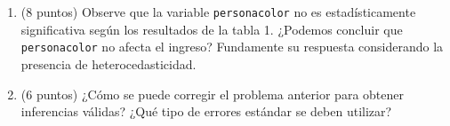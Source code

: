 \documentclass[10pt,a4paper]{article}
\begin{document}
\begin{enumerate}
\begin{enumerate}
    \[
    \hat{\mu}^2 = a_1 + a_2 IQ + a_3 Educ + a_4 Exper + a_5 Tenure + a_6 personacolor + v
    \]

    ¿Puede usarse esta regresión para testear la presencia de heterocedasticidad? Explique e interprete.

      \item (8 puntos) Observe que la variable \texttt{personacolor} no es estadísticamente significativa según los resultados de la tabla 1. ¿Podemos concluir que \texttt{personacolor} no afecta el ingreso? Fundamente su respuesta considerando la presencia de heterocedasticidad. 

        \item (6 puntos) ¿Cómo se puede corregir el problema anterior para obtener inferencias válidas? ¿Qué tipo de errores estándar se deben utilizar? 

   
\end{enumerate}

\end{enumerate}
\end{document}
